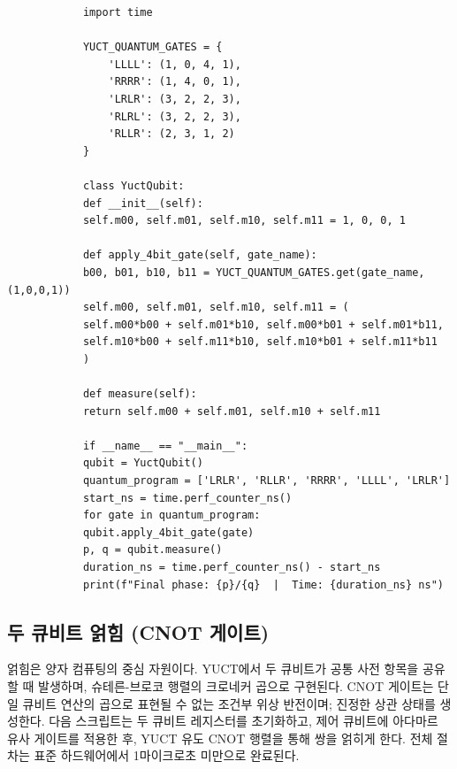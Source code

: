 \documentclass[11pt,a4paper]{article}
\begin{document}
	\begin{tcolorbox}[title=YUCT 단일 큐비트 에뮬레이터 (Python), breakable]
		\begin{lstlisting}
			import time
			
			YUCT_QUANTUM_GATES = {
				'LLLL': (1, 0, 4, 1),
				'RRRR': (1, 4, 0, 1),
				'LRLR': (3, 2, 2, 3),
				'RLRL': (3, 2, 2, 3),
				'RLLR': (2, 3, 1, 2)
			}
			
			class YuctQubit:
			def __init__(self):
			self.m00, self.m01, self.m10, self.m11 = 1, 0, 0, 1
			
			def apply_4bit_gate(self, gate_name):
			b00, b01, b10, b11 = YUCT_QUANTUM_GATES.get(gate_name, (1,0,0,1))
			self.m00, self.m01, self.m10, self.m11 = (
			self.m00*b00 + self.m01*b10, self.m00*b01 + self.m01*b11,
			self.m10*b00 + self.m11*b10, self.m10*b01 + self.m11*b11
			)
			
			def measure(self):
			return self.m00 + self.m01, self.m10 + self.m11
			
			if __name__ == "__main__":
			qubit = YuctQubit()
			quantum_program = ['LRLR', 'RLLR', 'RRRR', 'LLLL', 'LRLR']
			start_ns = time.perf_counter_ns()
			for gate in quantum_program:
			qubit.apply_4bit_gate(gate)
			p, q = qubit.measure()
			duration_ns = time.perf_counter_ns() - start_ns
			print(f"Final phase: {p}/{q}  |  Time: {duration_ns} ns")
		\end{lstlisting}
	\end{tcolorbox}
	
	\subsection{두 큐비트 얽힘 (CNOT 게이트)}
	
	얽힘은 양자 컴퓨팅의 중심 자원이다. YUCT에서 두 큐비트가 공통 사전 항목을 공유할 때 발생하며, 슈테른-브로코 행렬의 크로네커 곱으로 구현된다. CNOT 게이트는 단일 큐비트 연산의 곱으로 표현될 수 없는 조건부 위상 반전이며; 진정한 상관 상태를 생성한다. 다음 스크립트는 두 큐비트 레지스터를 초기화하고, 제어 큐비트에 아다마르 유사 게이트를 적용한 후, YUCT 유도 CNOT 행렬을 통해 쌍을 얽히게 한다. 전체 절차는 표준 하드웨어에서 1마이크로초 미만으로 완료된다.
	
\end{document}
